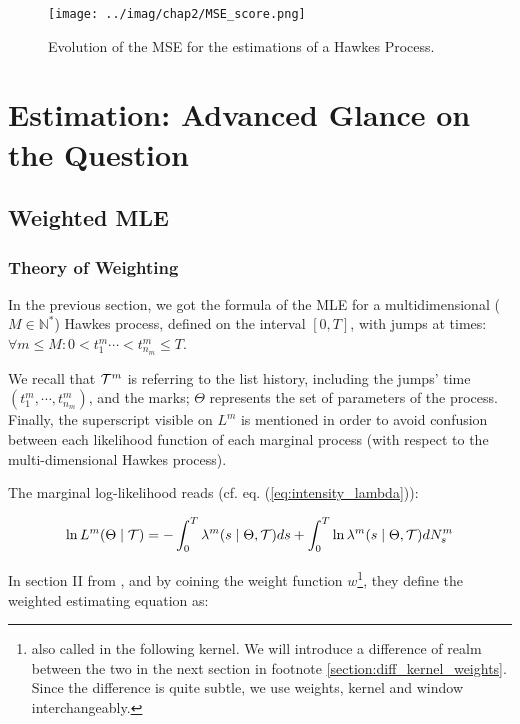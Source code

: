 \documentclass[11pt]{book}
\begin{document}
\begin{figure}
\centering
\texttt{[image: ../imag/chap2/MSE\_score.png]}
\caption{Evolution of the MSE for the estimations of a Hawkes Process.}
\label{fig:MSE_1}
\end{figure}








\chapter{Estimation: Advanced Glance on the Question}
\section{Weighted MLE}
\subsection{Theory of Weighting}
In the previous section, we got the formula of the MLE for a multidimensional ($ M \in \mathbb N^*$) Hawkes process, defined on the interval $[0,T]$, with jumps at times: $ \forall m \leq M: 0 < t_{1}^m \cdots < t_{n_m}^m \leq T $.

We recall that $ \mathcal{T}^m $ is referring to the list history, including the jumps' time $( t_{1}^m, \cdots , t_{n_m}^m ) $, and the marks; $\Theta$ represents the set of parameters of the process. Finally, the superscript visible on $L^m$ is mentioned in order to avoid confusion between each likelihood function of each marginal process (with respect to the multi-dimensional Hawkes process). 

The marginal log-likelihood reads (cf. eq. (\ref{eq:intensity_lambda})):


\begin{equation}
\ln L^m( \Theta \mid \mathcal{T} ) = - \int_0^T \lambda^{m} ( s \mid \Theta , \mathcal{T} ) ds + \int_0^T \ln \lambda^{m}( s \mid \Theta , \mathcal{T} ) d N_s^m \label{eq:log_likelihood}
\end{equation}



In section II from \cite{weighted_likelihood}, and by coining the weight function $w$\footnote{also called in the following kernel. We will introduce a difference of realm between the two in the next section in footnote \ref{section:diff_kernel_weights}. Since the difference is quite subtle, we use weights, kernel and window interchangeably.}, they define the weighted estimating equation as:
\end{document}
